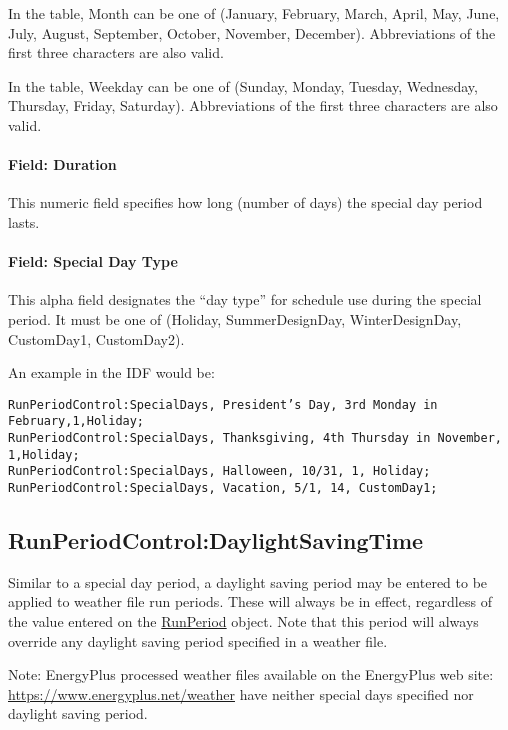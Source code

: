 In the table, Month can be one of (January, February, March, April, May, June, July, August, September, October, November, December). Abbreviations of the first three characters are also valid.

In the table, Weekday can be one of (Sunday, Monday, Tuesday, Wednesday, Thursday, Friday, Saturday). Abbreviations of the first three characters are also valid.

\paragraph{Field: Duration}\label{field-duration}

This numeric field specifies how long (number of days) the special day period lasts.

\paragraph{Field: Special Day Type}\label{field-special-day-type}

This alpha field designates the ``day type'' for schedule use during the special period. It must be one of (Holiday, SummerDesignDay, WinterDesignDay, CustomDay1, CustomDay2).

An example in the IDF would be:

\begin{lstlisting}
RunPeriodControl:SpecialDays, President’s Day, 3rd Monday in February,1,Holiday;
RunPeriodControl:SpecialDays, Thanksgiving, 4th Thursday in November, 1,Holiday;
RunPeriodControl:SpecialDays, Halloween, 10/31, 1, Holiday;
RunPeriodControl:SpecialDays, Vacation, 5/1, 14, CustomDay1;
\end{lstlisting}

\subsection{RunPeriodControl:DaylightSavingTime}\label{runperiodcontroldaylightsavingtime}

Similar to a special day period, a daylight saving period may be entered to be applied to weather file run periods. These will always be in effect, regardless of the value entered on the \hyperref[runperiod]{RunPeriod} object. Note that this period will always override any daylight saving period specified in a weather file.

\begin{callout}
Note: EnergyPlus processed weather files available on the EnergyPlus web site: \url{https://www.energyplus.net/weather} have neither special days specified nor daylight saving period.

\end{callout}

